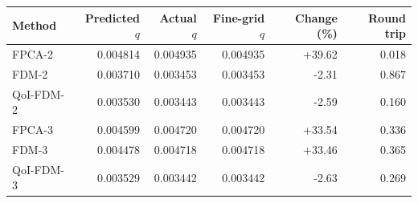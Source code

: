 \begin{tabular}{lrrrrr}
\toprule
Method & Predicted $q$ & Actual $q$ & Fine-grid $q$ & Change (\%) & Round trip\\
\midrule
FPCA-2 & 0.004814 & 0.004935 & 0.004935 & +39.62 & 0.018\\
FDM-2 & 0.003710 & 0.003453 & 0.003453 & -2.31 & 0.867\\
QoI-FDM-2 & 0.003530 & 0.003443 & 0.003443 & -2.59 & 0.160\\
FPCA-3 & 0.004599 & 0.004720 & 0.004720 & +33.54 & 0.336\\
FDM-3 & 0.004478 & 0.004718 & 0.004718 & +33.46 & 0.365\\
QoI-FDM-3 & 0.003529 & 0.003442 & 0.003442 & -2.63 & 0.269\\
\bottomrule
\end{tabular}
